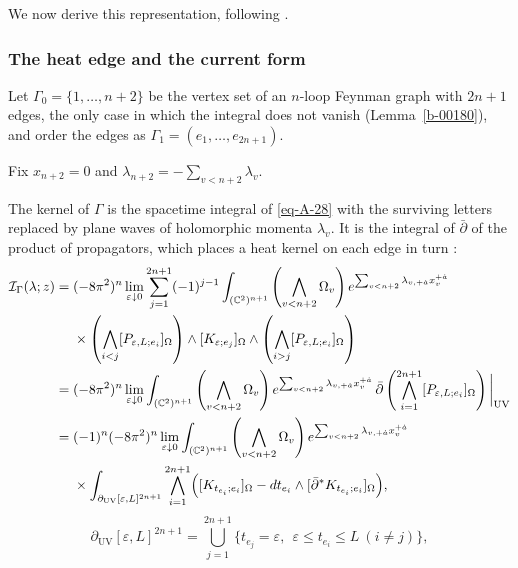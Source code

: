 \documentclass[11pt]{article}
\numberwithin{equation}{section}
\numberwithin{figure}{section}
\numberwithin{table}{section}
\begin{document}
We now derive this representation, following \cite{Wang,operatope}.

\subsubsection*{The heat edge and the current form}\label{sec-B-kernel}

Let $\Gamma_0=\{1,\ldots,n+2\}$ be the vertex set of an $n$-loop Feynman graph with $2n+1$ edges, the only case in which the integral does not vanish (Lemma~\ref{b-00180}), and order the edges as $\Gamma_1=(e_1,\ldots,e_{2n+1})$.

Fix $x_{n+2}=0$ and $\lambda_{n+2}=-\sum_{v<n+2}\lambda_v$.

The kernel of $\Gamma$ is the spacetime integral of \eqref{eq-A-28} with the surviving letters replaced by plane waves of holomorphic momenta $\lambda_v$. It is the integral of $\bar\partial$ of the product of propagators, which places a heat kernel on each edge in turn \cite{Wang,operatope}:
\begin{equation}\label{eq-1-7}
\begin{aligned}
\mathcal I_\Gamma(\lambda;z)
={}&(-8\pi^2)^n\lim_{\varepsilon\downarrow0}
\sum_{j=1}^{2n+1}(-1)^{j-1}
\int_{(\mathbb C^2)^{n+1}}
\left(\bigwedge_{v<n+2}\Omega_v\right)
e^{\sum_{v<n+2}\lambda_{v,+\dot a}x_v^{+\dot a}}\\
&\times\left(\bigwedge_{i<j}[P_{\varepsilon,L;e_i}]_\Omega\right)
\wedge[K_{\varepsilon;e_j}]_\Omega
\wedge\left(\bigwedge_{i>j}[P_{\varepsilon,L;e_i}]_\Omega\right)\\
={}&(-8\pi^2)^n\lim_{\varepsilon\downarrow0}
\int_{(\mathbb C^2)^{n+1}}
\left(\bigwedge_{v<n+2}\Omega_v\right)
e^{\sum_{v<n+2}\lambda_{v,+\dot a}x_v^{+\dot a}}\,
\bar\partial\left(\bigwedge_{i=1}^{2n+1}[P_{\varepsilon,L;e_i}]_\Omega\right)\bigg|_{\mathrm{UV}}\\
={}&(-1)^n(-8\pi^2)^n\lim_{\varepsilon\downarrow0}
\int_{(\mathbb C^2)^{n+1}}
\left(\bigwedge_{v<n+2}\Omega_v\right)
e^{\sum_{v<n+2}\lambda_{v,+\dot a}x_v^{+\dot a}}\\
&\times\int_{\partial_{\mathrm{UV}}[\varepsilon,L]^{2n+1}}
\bigwedge_{i=1}^{2n+1}\Bigl([K_{t_{e_i};e_i}]_\Omega
-dt_{e_i}\wedge[\bar\partial^*K_{t_{e_i};e_i}]_\Omega\Bigr),
\end{aligned}
\end{equation}
\begin{equation}\label{eq-UV-boundary}
\partial_{\mathrm{UV}}[\varepsilon,L]^{2n+1}
=\bigcup_{j=1}^{2n+1}\bigl\{t_{e_j}=\varepsilon,\ \ \varepsilon\le t_{e_i}\le L\ (i\ne j)\bigr\},
\end{equation}
\end{document}
